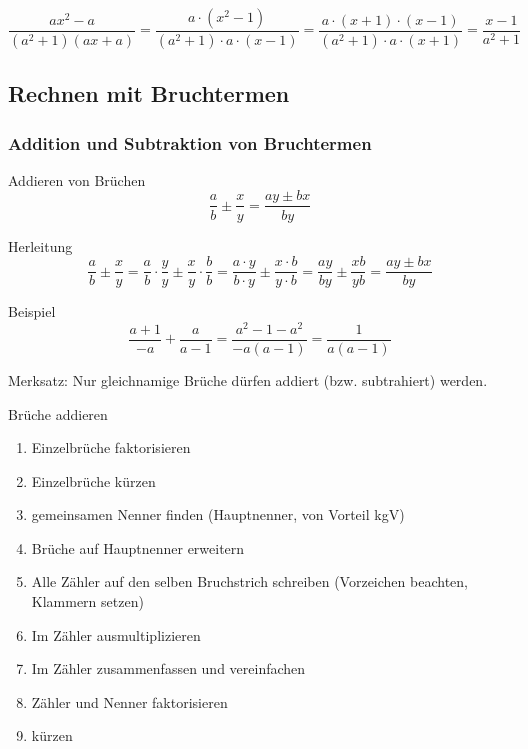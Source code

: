 \begin{beispiel}{}{}
$$\frac{ax^2 - a}{(a^2+1)(ax+a)}= \frac{a\cdot{}(x^2-1)}{(a^2+1)\cdot{}a\cdot{}(x-1)}=\frac{a\cdot{}(x+1)\cdot{}(x-1)}{(a^2+1)\cdot{}a\cdot{}(x+1)}=\frac{x-1}{a^2+1} $$
\end{beispiel}



\newpage
\subsection{Rechnen mit Bruchtermen}
  

\subsubsection{Addition und Subtraktion von Bruchtermen}

\begin{gesetz}{Addieren von Brüchen}{}
$$\frac{a}{b}\pm\frac{x}{y} = \frac{ay\pm{}bx}{by}$$
\end{gesetz}

Herleitung
$$\frac{a}{b}\pm\frac{x}{y} = \frac{a}{b}\cdot\frac{y}{y} \pm \frac{x}{y}\cdot\frac{b}{b} =
\frac{a\cdot y}{b\cdot y}\pm \frac{x\cdot b}{y \cdot b} = \frac{ay}{by}\pm\frac{xb}{yb} = \frac{ay\pm{}bx}{by}$$

Beispiel
$$\frac{a+1}{-a} + \frac{a}{a-1} = \frac{a^2 - 1 - a^2}{-a(a-1)} = \frac{1}{a(a-1)}$$

Merksatz: Nur gleichnamige Brüche dürfen addiert (bzw. subtrahiert)
werden.

\begin{rezept}{Brüche addieren}{}
\begin{enumerate}
	\item Einzelbrüche faktorisieren
	\item Einzelbrüche kürzen
	\item gemeinsamen Nenner finden (Hauptnenner, von Vorteil kgV)
	\item Brüche auf Hauptnenner erweitern
	\item Alle Zähler auf den selben Bruchstrich schreiben (Vorzeichen beachten, Klammern setzen)
	\item Im Zähler ausmultiplizieren
	\item Im Zähler zusammenfassen und vereinfachen
	\item Zähler und Nenner faktorisieren
	\item kürzen
\end{enumerate}
\end{rezept}

